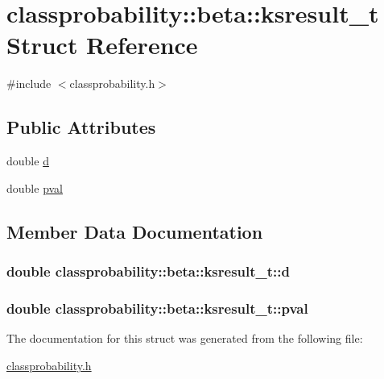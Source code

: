 \hypertarget{structclassprobability_1_1beta_1_1ksresult__t}{}\section{classprobability\+:\+:beta\+:\+:ksresult\+\_\+t Struct Reference}
\label{structclassprobability_1_1beta_1_1ksresult__t}


{\ttfamily \#include $<$classprobability.\+h$>$}

\subsection*{Public Attributes}
\begin{DoxyCompactItemize}
\item 
double \hyperlink{structclassprobability_1_1beta_1_1ksresult__t_a45e051852581ff66e9c3da0e3c22cb23}{d}
\item 
double \hyperlink{structclassprobability_1_1beta_1_1ksresult__t_a3d5697aa1fcc71c21680c52fb1877cd0}{pval}
\end{DoxyCompactItemize}


\subsection{Member Data Documentation}
\subsubsection[{\texorpdfstring{d}{d}}]{\setlength{\rightskip}{0pt plus 5cm}double classprobability\+::beta\+::ksresult\+\_\+t\+::d}\hypertarget{structclassprobability_1_1beta_1_1ksresult__t_a45e051852581ff66e9c3da0e3c22cb23}{}\label{structclassprobability_1_1beta_1_1ksresult__t_a45e051852581ff66e9c3da0e3c22cb23}
\subsubsection[{\texorpdfstring{pval}{pval}}]{\setlength{\rightskip}{0pt plus 5cm}double classprobability\+::beta\+::ksresult\+\_\+t\+::pval}\hypertarget{structclassprobability_1_1beta_1_1ksresult__t_a3d5697aa1fcc71c21680c52fb1877cd0}{}\label{structclassprobability_1_1beta_1_1ksresult__t_a3d5697aa1fcc71c21680c52fb1877cd0}


The documentation for this struct was generated from the following file\+:\begin{DoxyCompactItemize}
\item 
\hyperlink{classprobability_8h}{classprobability.\+h}\end{DoxyCompactItemize}
